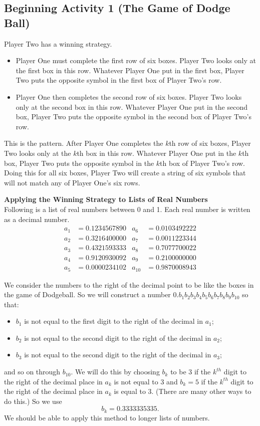 \documentclass[11pt]{article}
\begin{document}
\subsection*{Beginning Activity 1 (The Game of Dodge Ball)}

Player Two has a winning strategy.
\begin{itemize}
\item Player One must complete the first row of six boxes.  Player Two looks only at the first box in this row.  Whatever Player One put in the first box, Player Two puts the opposite symbol in the first box of Player Two's row.

\item Player One then completes the second row of six boxes.  Player Two looks only at the second box in this row.  Whatever Player One put in the second box, Player Two puts the opposite symbol in the second box of Player Two's row.
\end{itemize}
This is the pattern.  After Player One completes the $k$th row of six boxes,  Player Two looks only at the $k$th box in this row.  Whatever Player One put in the $k$th box, Player Two puts the opposite symbol in the $k$th box of Player Two's row.  Doing this for all six boxes, Player Two will create a string of six symbols that will not match any of Player One's six rows.


\newpar
\textbf{Applying the Winning Strategy to Lists of Real Numbers} \\
Following is a list of real numbers between 0 and 1.  Each real number is written as a decimal number.
\begin{align*}
a_1 &= 0.1234567890   &  a_6 &= 0.0103492222 \\
a_2 &= 0.3216400000   &  a_7 &= 0.0011223344 \\
a_3 &= 0.4321593333   &  a_8 &= 0.7077700022 \\
a_4 &= 0.9120930092   &  a_9 &= 0.2100000000 \\
a_5 &= 0.0000234102   & a_{10} &= 0.9870008943 
\end{align*}

\newpar
We consider the numbers to the right of the decimal point to be like the boxes in the game of Dodgeball.  So we will construct a number $0.b_1 b_2 b_3 b_4 b_5 b_6 b_7 b_8 b_9 b_{10}$ so that:
\begin{itemize}
  \item $b_1$ is not equal to the first digit to the right of the decimal in $a_1$;
  \item $b_2$ is not equal to the second digit to the right of the decimal in $a_2$;
  \item $b_3$ is not equal to the second digit to the right of the decimal in $a_3$;
\end{itemize}
and so on through $b_{10}$.  We will do this by choosing $b_k$ to be 3 if the $k^{th}$ digit to the right of the decimal place in $a_k$ is not equal to 3 and $b_k = 5$ if the $k^{th}$ digit to the right of the decimal place in $a_k$ is equal to 3.  (There are many other ways to do this.)  So we use
\[
b_k = 0.3333335335.
\]
We should be able to apply this method to longer lists of numbers.
\end{document}
